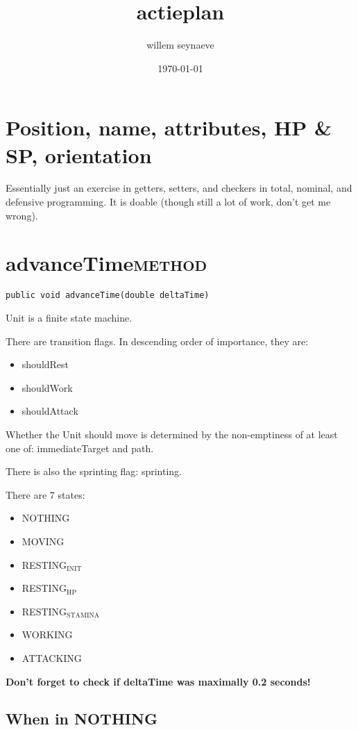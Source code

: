 \documentclass[11pt]{article}
\author{willem seynaeve}
\date{\today}
\title{actieplan}
\begin{document}
\maketitle
\tableofcontents

\section{Position, name, attributes, HP \& SP, orientation}
\label{sec-1}

Essentially just an exercise in getters, setters, and checkers in total,
nominal, and defensive programming. It is doable (though still a lot of work, 
don't get me wrong).


\section{advanceTime\hfill{}\textsc{method}}
\label{sec-2}

\begin{verbatim}
public void advanceTime(double deltaTime)
\end{verbatim}

Unit is a finite state machine.

There are transition flags. In descending order of
importance, they are:
\begin{itemize}
\item shouldRest
\item shouldWork
\item shouldAttack
\end{itemize}
Whether the Unit should move is determined by the non-emptiness of at least one
of: immediateTarget and path.

There is also the sprinting flag: sprinting.

There are 7 states:
\begin{itemize}
\item NOTHING
\item MOVING
\item RESTING$_{\text{INIT}}$
\item RESTING$_{\text{HP}}$
\item RESTING$_{\text{STAMINA}}$
\item WORKING
\item ATTACKING
\end{itemize}

\textbf{Don't forget to check if deltaTime was maximally 0.2 seconds!}

\subsection{When in NOTHING}
\label{sec-2-1}
\end{document}
